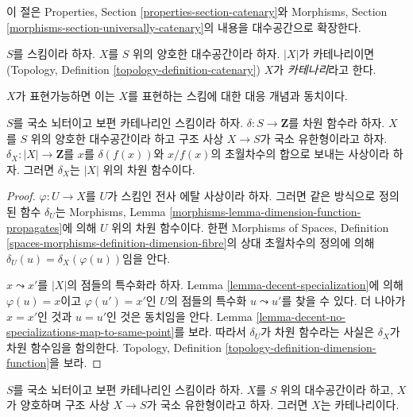 \noindent
이 절은 Properties, Section \ref{properties-section-catenary}와
Morphisms, Section \ref{morphisms-section-universally-catenary}의 내용을
대수공간으로 확장한다.

\begin{definition}
\label{definition-catenary}
$S$를 스킴이라 하자. $X$를 $S$ 위의 양호한 대수공간이라 하자.
$|X|$가 카테나리이면(Topology, Definition
\ref{topology-definition-catenary}) $X$가 {\it 카테나리}라고 한다.
\end{definition}

\noindent
$X$가 표현가능하면 이는 $X$를 표현하는 스킴에 대한 대응 개념과
동치이다.

\begin{lemma}
\label{lemma-scheme-with-dimension-function}
$S$를 국소 뇌터이고 보편 카테나리인 스킴이라 하자.
$\delta : S \to \mathbf{Z}$를 차원 함수라 하자.
$X$를 $S$ 위의 양호한 대수공간이라 하고 구조 사상
$X \to S$가 국소 유한형이라고 하자.
$\delta_X : |X| \to \mathbf{Z}$를 $x$를 $\delta(f(x))$와
$x/f(x)$의 초월차수의 합으로 보내는 사상이라 하자.
그러면 $\delta_X$는 $|X|$ 위의 차원 함수이다.
\end{lemma}

\begin{proof}
$\varphi : U \to X$를 $U$가 스킴인 전사 에탈 사상이라 하자.
그러면 같은 방식으로 정의된 함수 $\delta_U$는 Morphisms, Lemma
\ref{morphisms-lemma-dimension-function-propagates}에 의해 $U$ 위의
차원 함수이다. 한편 Morphisms of Spaces, Definition
\ref{spaces-morphisms-definition-dimension-fibre}의 상대 초월차수의
정의에 의해 $\delta_U(u) = \delta_X(\varphi(u))$임을 안다.

\medskip\noindent
$x \leadsto x'$를 $|X|$의 점들의 특수화라 하자.
Lemma \ref{lemma-decent-specialization}에 의해
$\varphi(u) = x$이고 $\varphi(u') = x'$인 $U$의 점들의 특수화
$u \leadsto u'$를 찾을 수 있다. 더 나아가
$x = x'$인 것과 $u = u'$인 것은 동치임을 안다. Lemma
\ref{lemma-decent-no-specializations-map-to-same-point}를 보라.
따라서 $\delta_U$가 차원 함수라는 사실은 $\delta_X$가 차원
함수임을 함의한다. Topology, Definition
\ref{topology-definition-dimension-function}을 보라.
\end{proof}

\begin{lemma}
\label{lemma-universally-catenary-scheme}
$S$를 국소 뇌터이고 보편 카테나리인 스킴이라 하자.
$X$를 $S$ 위의 대수공간이라 하고, $X$가 양호하며 구조 사상
$X \to S$가 국소 유한형이라고 하자. 그러면 $X$는 카테나리이다.
\end{lemma}

